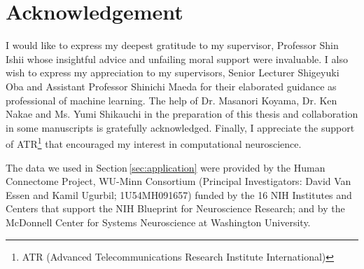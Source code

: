 \section{Acknowledgement}
%
I would like to express my deepest gratitude to my supervisor, Professor Shin Ishii whose
insightful advice and unfailing moral support were invaluable.
I also wish to express my appreciation to my supervisors,
Senior Lecturer Shigeyuki Oba and Assistant Professor Shinichi Maeda
for their elaborated guidance as professional of machine learning.
The help of Dr. Masanori Koyama, Dr. Ken Nakae and Ms. Yumi Shikauchi
in the preparation of this thesis and collaboration in some manuscripts \cite{Koyamada2014a,Koyamada2014b,Koyamada2015}
is gratefully acknowledged.
Finally, I appreciate the support of ATR\footnote{ATR (Advanced
Telecommunications Research Institute International)} that encouraged my interest in
computational neuroscience.

The data we used in Section\,\ref{sec:application} were provided by the Human Connectome Project,
WU-Minn Consortium
(Principal Investigators: David Van Essen and Kamil Ugurbil;
1U54MH091657) funded by the 16 NIH Institutes and Centers that support
the NIH Blueprint for Neuroscience Research; and by the McDonnell Center
for Systems Neuroscience at Washington University.
